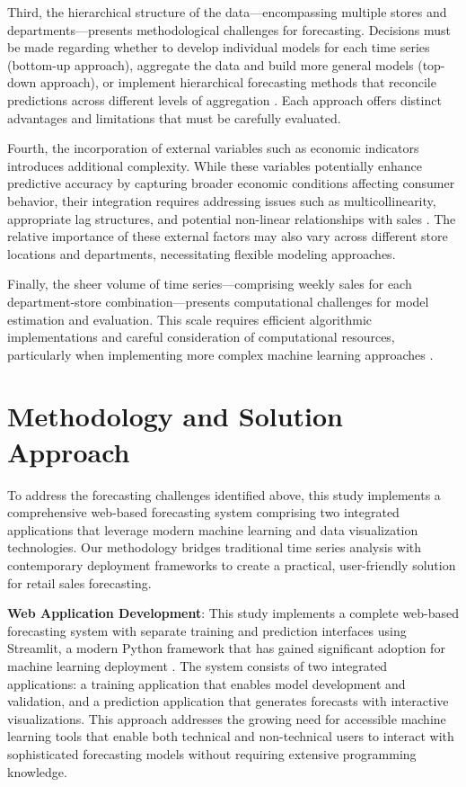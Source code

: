 Third, the hierarchical structure of the data—encompassing multiple stores and departments—presents methodological challenges for forecasting. Decisions must be made regarding whether to develop individual models for each time series (bottom-up approach), aggregate the data and build more general models (top-down approach), or implement hierarchical forecasting methods that reconcile predictions across different levels of aggregation \cite{Fildes:2019}. Each approach offers distinct advantages and limitations that must be carefully evaluated.

Fourth, the incorporation of external variables such as economic indicators introduces additional complexity. While these variables potentially enhance predictive accuracy by capturing broader economic conditions affecting consumer behavior, their integration requires addressing issues such as multicollinearity, appropriate lag structures, and potential non-linear relationships with sales \cite{Zhang:2021}. The relative importance of these external factors may also vary across different store locations and departments, necessitating flexible modeling approaches.

Finally, the sheer volume of time series—comprising weekly sales for each department-store combination—presents computational challenges for model estimation and evaluation. This scale requires efficient algorithmic implementations and careful consideration of computational resources, particularly when implementing more complex machine learning approaches \cite{Pao:2017}.

\section{Methodology and Solution Approach}

To address the forecasting challenges identified above, this study implements a comprehensive web-based forecasting system comprising two integrated applications that leverage modern machine learning and data visualization technologies. Our methodology bridges traditional time series analysis with contemporary deployment frameworks to create a practical, user-friendly solution for retail sales forecasting.

\textbf{Web Application Development}: This study implements a complete web-based forecasting system with separate training and prediction interfaces using Streamlit, a modern Python framework that has gained significant adoption for machine learning deployment \cite{Surya:2023}. The system consists of two integrated applications: a training application that enables model development and validation, and a prediction application that generates forecasts with interactive visualizations. This approach addresses the growing need for accessible machine learning tools that enable both technical and non-technical users to interact with sophisticated forecasting models without requiring extensive programming knowledge.

